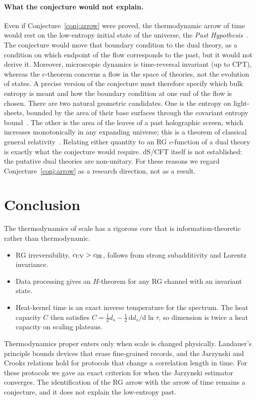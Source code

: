 \documentclass[11pt]{article}
\theoremstyle{remark}\newtheorem*{remark}{Remark}
\newcommand{\dd}{\mathrm{d}}
\begin{document}
\paragraph{What the conjecture would not explain.}
Even if Conjecture~\ref{conj:arrow} were proved, the thermodynamic arrow of time would rest on the low-entropy
initial state of the universe, the \emph{Past Hypothesis}~\cite{Albert}. The conjecture would move that boundary
condition to the dual theory, as a condition on which endpoint of the flow corresponds to the past, but it would
not derive it. Moreover, microscopic dynamics is time-reversal invariant (up to CPT), whereas the $c$-theorem
concerns a flow in the space of theories, not the evolution of states. A precise version of the conjecture
must therefore specify which bulk entropy is meant and how the boundary condition at one end of the flow is chosen.
There are two natural geometric candidates. One is the entropy on light-sheets, bounded by the area of their base
surfaces through the covariant entropy bound~\cite{Bousso1999}. The other is the area of the leaves of a past
holographic screen, which increases monotonically in any expanding universe; this is a theorem of classical general
relativity~\cite{BoussoEngelhardt}. Relating either quantity to an RG $c$-function of a dual theory is exactly what
the conjecture would require.
dS/CFT itself is not established: the putative dual theories are non-unitary. For these reasons we regard
Conjecture~\ref{conj:arrow} as a research direction, not as a result.

\section{Conclusion}
\label{sec:conclusion}

The thermodynamics of scale has a rigorous core that is information-theoretic rather than thermodynamic.
\begin{itemize}
\item RG irreversibility, $c_{\rm UV}>c_{\rm IR}$, follows from strong subadditivity and Lorentz invariance.
\item Data processing gives an $H$-theorem for any RG channel with an invariant state.
\item Heat-kernel time is an exact inverse temperature for the spectrum. The heat capacity $C$ then satisfies
$C=\tfrac12d_s-\tfrac12\,\dd d_s/\dd\ln\tau$, so dimension is twice a heat capacity on scaling plateaus.
\end{itemize}
Thermodynamics proper enters only when scale is changed physically. Landauer's principle bounds devices that erase
fine-grained records, and the Jarzynski and Crooks relations hold for protocols that change a correlation length in
time. For these protocols we gave an exact criterion for when the Jarzynski estimator converges. The identification
of the RG arrow with the arrow of time remains a conjecture, and it does not explain the low-entropy past.
\end{document}
